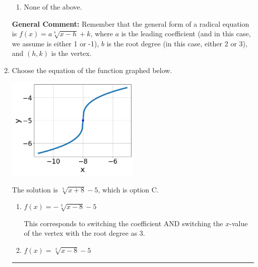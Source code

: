 \documentclass{extbook}[14pt]
\newcommand{\litem}[1]{\item #1

\rule{\textwidth}{0.4pt}}
\begin{document}
\begin{enumerate}
{\begin{enumerate}[label=\Alph*.]
\item None of the above.\end{enumerate}
\textbf{General Comment:} Remember that the general form of a radical equation is $ f(x) = a \sqrt[b]{x - h} + k $, where $a$ is the leading coefficient (and in this case, we assume is either 1 or -1), $b$ is the root degree (in this case, either 2 or 3), and $(h, k)$ is the vertex.
}
\litem{
Choose the equation of the function graphed below.

\begin{center}
    \includegraphics[width=0.5\textwidth]{../Figures/radicalGraphToEquationC.png}
\end{center}



The solution is \( \sqrt[3]{x + 8} - 5 \), which is option C.\begin{enumerate}[label=\Alph*.]
\item \( f(x) = - \sqrt[3]{x - 8} - 5 \)

This corresponds to switching the coefficient AND switching the $x$-value of the vertex with the root degree as $3$.
\item \( f(x) = \sqrt[3]{x - 8} - 5 \)


\end{enumerate}}
\end{enumerate}
\end{document}
